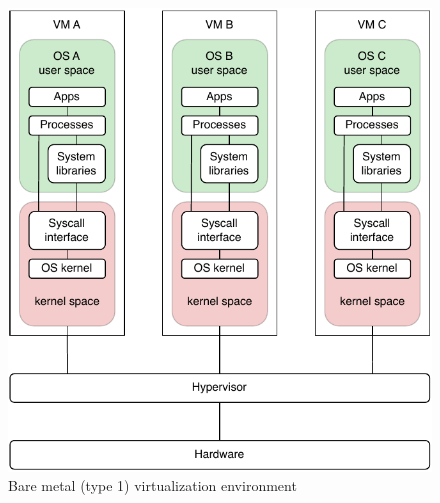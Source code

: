 \begin{figure}[htbp]
    \vspace{10pt}
    \centering
    \includegraphics{assets/type_1_virtualization.pdf}
    \caption{Bare metal (type 1) virtualization environment}
    \label{fig:bare_metal_virtualization}
    \vspace{10pt}
\end{figure}

